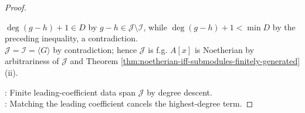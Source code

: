 \begin{theorem}
\begin{proof}
\begin{enumerate}[label=(\roman*)]
$\deg(g-h)+1\in D$ by $g-h\in\mathcal{J}\setminus\mathcal{I}$, while $\deg(g-h)+1<\min\limits D$ by the preceding inequality, a contradiction.\\
$\mathcal{J}=\mathcal{I}=\langle G\rangle$ by contradiction; hence $\mathcal{J}$ is f.g. $A[x]$ is Noetherian by arbitrariness of $\mathcal{J}$ and Theorem \ref{thm:noetherian-iff-submodules-finitely-generated}(ii).
\end{enumerate}
: Finite leading-coefficient data span $\mathcal{J}$ by degree descent.\\
: Matching the leading coefficient cancels the highest-degree term.
\end{proof}
\end{theorem}
